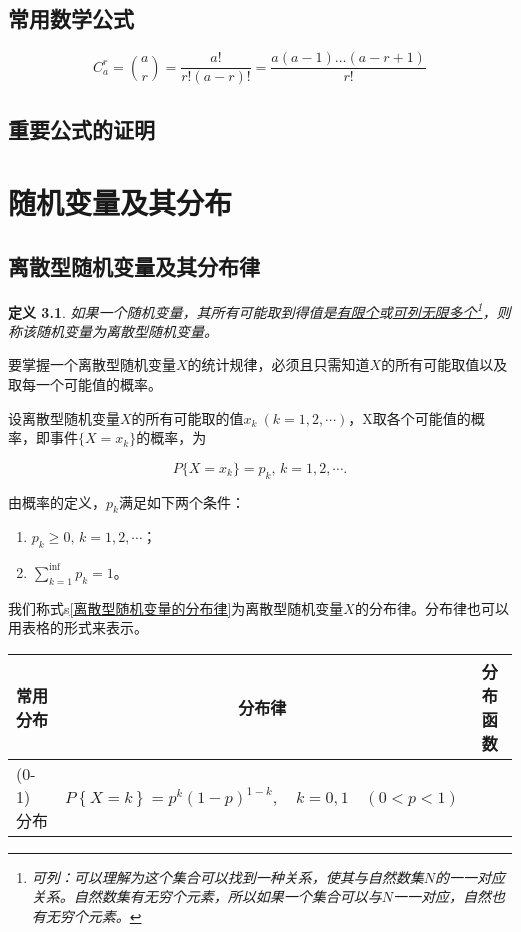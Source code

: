 \documentclass[11pt]{book}
\newtheorem{definition}{\hspace{2em}\textbf{定义}}
\newcounter{#2}
\newcounter{#2}[#1]
\numberwithin{#2}{#1}
\newcommand{\inlinekeywords}[1]{\uline{#1}}
\begin{document}
	\section{常用数学公式}
		\begin{equation}
			C_a ^r =\binom{a}{r}=\frac{a!}{r!(a-r)!}=\frac{a(a-1)\dots (a-r+1)}{r!}
		\end{equation}
	\section{重要公式的证明}
	
	\chapter{随机变量及其分布}
	
	\section{离散型随机变量及其分布律}
		\begin{definition}
			如果一个随机变量，其所有可能取到得值是\inlinekeywords{有限个}或\inlinekeywords{可列无限多个}\footnote{可列：可以理解为这个集合可以找到一种关系，使其与自然数集$ N $的一一对应关系。自然数集有无穷个元素，所以如果一个集合可以与$ N $一一对应，自然也有无穷个元素。}，则称该随机变量为离散型随机变量。
		\end{definition}
	
		要掌握一个离散型随机变量$ X $的统计规律，必须且只需知道$ X $的所有可能取值以及取每一个可能值的概率。
		
		设离散型随机变量$ X $的所有可能取的值$ x_k\ (k=1,2,\cdots) $，X取各个可能值的概率，即事件$ \{X=x_k\} $的概率，为
		
		\begin{equation}
			P\{X=x_k\} = p_k\text{, } k=1,2,\cdots.
		\end{equation}\label{离散型随机变量的分布律}
		
		由概率的定义，$ p_k $满足如下两个条件：
		\begin{enumerate}
			\item $ p_k\ge 0\text{, } k=1,2,\cdots $；
			\item $ \sum_{k=1}^{\inf}p_{k}=1 $。
		\end{enumerate}
	
		我们称式s\ref{离散型随机变量的分布律}为离散型随机变量$ X $的分布律。分布律也可以用表格的形式来表示。
		
		
		
		\begin{tabular}{|l|c|c|}
			\hline
			常用分布 & 分布律 & 分布函数 \\
			\hline
			(0-1) 分布 & $
			P\left\lbrace X=k\right\rbrace =p^k\left( 1-p\right) ^{1-k},\hspace{1em}k=0,1 \hspace{1em}\left( 0<p<1\right) 
			$ & \\
			\hline
		\end{tabular}
\end{document}
